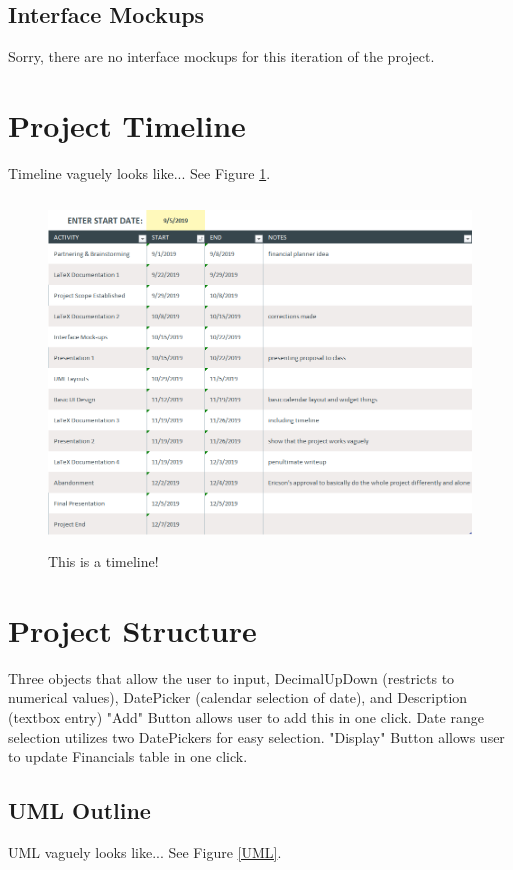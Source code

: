 \documentclass[10pt,conference,onecolumn,compsoc]{IEEEtran}
\begin{document}

\subsection{Interface Mockups}
Sorry, there are no interface mockups for this iteration of the project.

\section{Project Timeline}
Timeline vaguely looks like... See Figure \ref{Timeline}.

\begin{figure}[ht!]
\includegraphics[height=350px, width=500px]{Timeline.png}
\caption{This is a timeline!}
\label{Timeline}
\end{figure}

\section{Project Structure}
Three objects that allow the user to input, DecimalUpDown (restricts to numerical values), DatePicker (calendar selection of date), and Description (textbox entry)
 "Add" Button allows user to add this in one click.
Date range selection utilizes two DatePickers for easy selection.
"Display" Button allows user to update Financials table in one click.

\subsection{UML Outline}
UML vaguely looks like... See Figure \ref{UML}.
\end{document}
